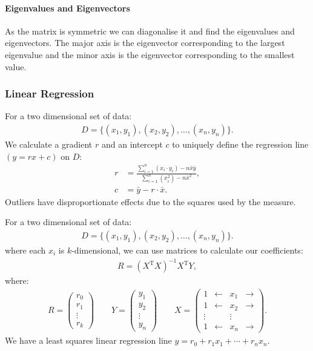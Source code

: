 \paragraph{Eigenvalues and Eigenvectors} As the matrix is symmetric
we can diagonalise it and find the eigenvalues and eigenvectors.
The major axis is the eigenvector corresponding to the largest
eigenvalue and the minor axis is the eigenvector corresponding
to the smallest value.

\subsubsection{Linear Regression}

For a two dimensional set of data: \begin{gather*}
    D = \{(x_1, y_1), (x_2, y_2), \ldots, (x_n, y_n)\}.
\end{gather*} We calculate a gradient $r$ and an intercept $c$ to 
uniquely define the regression line $(y = rx + c)$ on $D$: \begin{align*}
    r &= \frac{
        \sum_{i = 1}^n (x_i \cdot y_i) - n\bar{x}\bar{y}
    }{
        \sum_{i = 1}^n (x_i^2) - n\bar{x}^2
    }, \\
    c &= \bar{y} - r \cdot \bar{x}.
\end{align*} Outliers have disproportionate effects due to the
squares used by the measure. 

\newpage

\noindent
For a two dimensional set of data: 
\begin{gather*}
    D = \{(x_1, y_1), (x_2, y_2), \ldots, (x_n, y_n)\}.
\end{gather*} where each $x_i$ is $k$-dimensional,
we can use matrices to calculate our coefficients: \begin{gather*}
    R = (X^{\text{T}}X)^{-1}X^{\text{T}}Y,
\end{gather*} where: \begin{gather*}
    R = \begin{pmatrix}
        r_0 \\ r_1 \\ \vdots \\ r_k
    \end{pmatrix} 
    \qquad
    Y = \begin{pmatrix}
        y_1 \\ y_2 \\ \vdots \\ y_n
    \end{pmatrix}
    \qquad
    X = \begin{pmatrix}
        1      & \leftarrow & x_1    & \rightarrow \\
        1      & \leftarrow & x_2    & \rightarrow \\
        \vdots &            & \vdots &             \\
        1      & \leftarrow & x_n    & \rightarrow
    \end{pmatrix}.
\end{gather*} We have a least squares linear regression line
$y = r_0 + r_1x_1 + \cdots + r_nx_n$.

